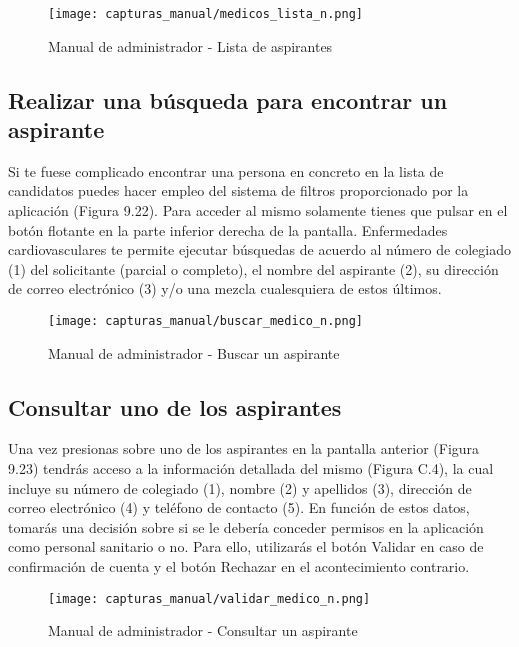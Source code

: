 \documentclass[11pt,spanish,
		listoftables,listoffigures]
		{tfgplantilla}
\begin{document}
\begin{figure}[H]
\centering
\texttt{[image: capturas\_manual/medicos\_lista\_n.png]}
\caption{Manual de administrador - Lista de aspirantes}
\end{figure}

\newpage
\subsection {Realizar una búsqueda para encontrar un aspirante}

Si te fuese complicado encontrar una persona en concreto en la lista de candidatos puedes hacer empleo del sistema de filtros proporcionado por la aplicación (Figura 9.22). Para acceder al mismo solamente tienes que pulsar en el botón flotante en la parte inferior derecha de la pantalla. Enfermedades cardiovasculares te permite ejecutar búsquedas de acuerdo al número de colegiado (1) del solicitante (parcial o completo), el nombre del aspirante (2), su dirección de correo electrónico (3) y/o una mezcla cualesquiera de estos últimos.

\begin{figure}[H]
\centering
\texttt{[image: capturas\_manual/buscar\_medico\_n.png]}
\caption{Manual de administrador - Buscar un aspirante}
\end{figure}

\newpage
\subsection {Consultar uno de los aspirantes}

Una vez presionas sobre uno de los aspirantes en la pantalla anterior (Figura 9.23) tendrás acceso a la información detallada del mismo (Figura C.4), la cual incluye su número de colegiado (1), nombre (2) y apellidos (3), dirección de correo electrónico (4) y teléfono de contacto (5). En función de estos datos, tomarás una decisión sobre si se le debería conceder permisos en la aplicación como personal sanitario o no. Para ello, utilizarás el botón \textquotedbl Validar\textquotedbl{} en caso de confirmación de cuenta y el botón \textquotedbl Rechazar\textquotedbl{} en el acontecimiento contrario.

\begin{figure}[H]
\centering
\texttt{[image: capturas\_manual/validar\_medico\_n.png]}
\caption{Manual de administrador - Consultar un aspirante}
\end{figure}
\end{document}
